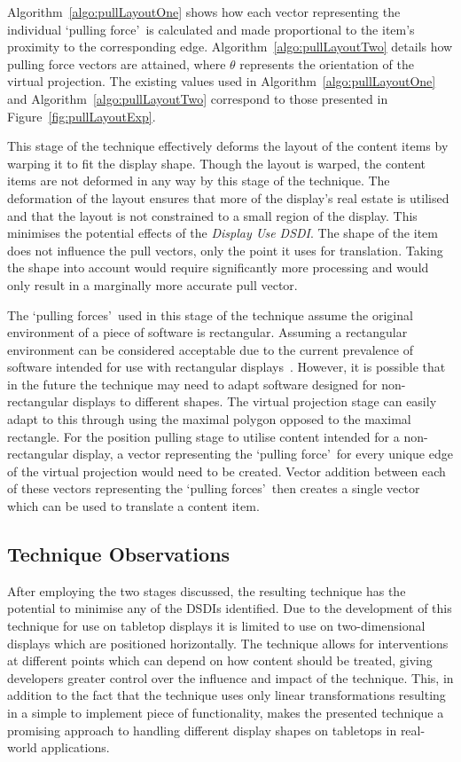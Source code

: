 \documentclass[twocolumn,compsoc]{cvm}
\begin{document}
Algorithm~\ref{algo:pullLayoutOne} shows how each vector representing the individual \lq pulling force\rq\ is calculated and made proportional to the item's proximity to the corresponding edge.
Algorithm~\ref{algo:pullLayoutTwo} details how pulling force vectors are attained, where $\theta$ represents the orientation of the virtual projection.
The existing values used in Algorithm~\ref{algo:pullLayoutOne} and Algorithm~\ref{algo:pullLayoutTwo} correspond to those presented in Figure~\ref{fig:pullLayoutExp}.

This stage of the technique effectively deforms the layout of the content items by warping it to fit the display shape.
Though the layout is warped, the content items are not deformed in any way by this stage of the technique.
The deformation of the layout ensures that more of the display's real estate is utilised and that the layout is not constrained to a small region of the display.
This minimises the potential effects of the {\emph{Display Use \ac{DSDI}}}.
The shape of the item does not influence the pull vectors, only the point it uses for translation.
Taking the shape into account would require significantly more processing and would only result in a marginally more accurate pull vector.

The \lq pulling forces\rq\ used in this stage of the technique assume the original environment of a piece of software is rectangular.
Assuming a rectangular environment can be considered acceptable due to the current prevalence of software intended for use with rectangular displays~\cite{VanDam2001}.
However, it is possible that in the future the technique may need to adapt software designed for non-rectangular displays to different shapes.
The virtual projection stage can easily adapt to this through using the maximal polygon opposed to the maximal rectangle.
For the position pulling stage to utilise content intended for a non-rectangular display, a vector representing the \lq pulling force\rq\ for every unique edge of the virtual projection would need to be created.
Vector addition between each of these vectors representing the \lq pulling forces\rq\ then creates a single vector which can be used to translate a content item.

\subsection{Technique Observations}
\label{subsec:techniqueobservations} 

After employing the two stages discussed, the resulting technique has the potential to minimise any of the \acp{DSDI} identified. 
Due to the development of this technique for use on tabletop displays it is limited to use on two-dimensional displays which are positioned horizontally.
The technique allows for interventions at different points which can depend on how content should be treated, giving developers greater control over the influence and impact of the technique.
This, in addition to the fact that the technique uses only linear transformations resulting in a simple to implement piece of functionality, makes the presented technique a promising approach to handling different display shapes on tabletops in real-world applications.
\end{document}
